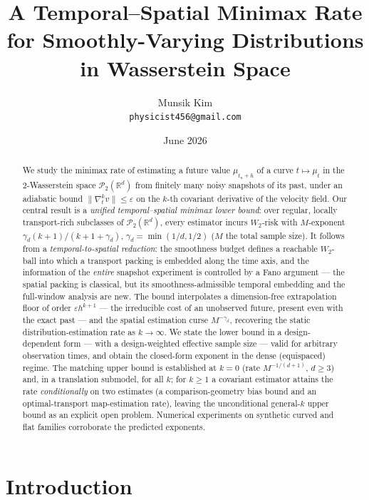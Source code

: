 \documentclass[11pt]{article}
\title{\vspace{-2em}A Temporal--Spatial Minimax Rate for Smoothly-Varying Distributions in Wasserstein Space}
\author{Munsik Kim\\ \texttt{physicist456@gmail.com}}
\date{June 2026}
\theoremstyle{definition}
\theoremstyle{remark}
\newcommand{\R}{\mathbb{R}}
\newcommand{\PP}{\mathcal{P}_2(\R^d)}
\begin{document}
\maketitle
\vspace{-1.5em}

\begin{abstract}\noindent
We study the minimax rate of estimating a future value $\mu_{t_n+h}$ of a curve $t\mapsto\mu_t$ in
the $2$-Wasserstein space $\PP$ from finitely many noisy snapshots of its past, under an adiabatic
bound $\|\nabla_t^k v\|\le\varepsilon$ on the $k$-th covariant derivative of the velocity field. Our
central result is a \emph{unified temporal--spatial minimax lower bound}: over regular, locally
transport-rich subclasses of $\PP$, every estimator incurs $W_2$-risk with $M$-exponent
$\gamma_d(k+1)/(k+1+\gamma_d)$, $\gamma_d=\min(1/d,1/2)$ ($M$ the total sample size). It follows from
a \emph{temporal-to-spatial reduction}: the smoothness budget defines a reachable $W_2$-ball into
which a transport packing is embedded along the time axis, and the information of the \emph{entire}
snapshot experiment is controlled by a Fano argument --- the spatial packing is classical, but its
smoothness-admissible temporal embedding and the full-window analysis are new. The bound interpolates
a dimension-free extrapolation floor of order $\varepsilon h^{k+1}$ --- the irreducible cost of an
unobserved future, present even with the exact past --- and the spatial estimation curse
$M^{-\gamma_d}$, recovering the static distribution-estimation rate as $k\to\infty$. We state the
lower bound in a design-dependent form --- with a design-weighted effective sample size --- valid for
arbitrary observation times, and obtain the closed-form exponent in the dense (equispaced) regime. The matching upper bound is established at
$k=0$ (rate $M^{-1/(d+1)}$, $d\ge3$) and, in a translation submodel, for all $k$; for $k\ge1$ a
covariant estimator attains the rate \emph{conditionally} on two estimates (a comparison-geometry
bias bound and an optimal-transport map-estimation rate), leaving the unconditional general-$k$ upper
bound as an explicit open problem. Numerical experiments on synthetic curved and flat families
corroborate the predicted exponents.
\end{abstract}

\section{Introduction}
\end{document}
